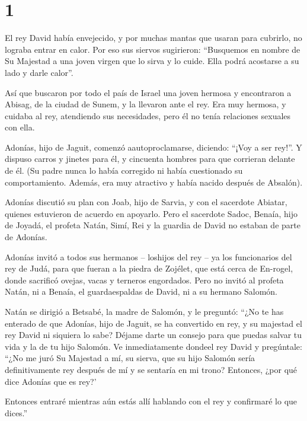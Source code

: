 \hypertarget{section}{%
\section{1}\label{section}}

 El rey David había envejecido, y por muchas mantas que
usaran para cubrirlo, no lograba entrar en calor.  Por eso
sus siervos sugirieron: ``Busquemos en nombre de Su Majestad a una joven
virgen que lo sirva y lo cuide. Ella podrá acostarse a su lado y darle
calor''.

 Así que buscaron por todo el país de Israel una joven
hermosa y encontraron a Abisag, de la ciudad de Sunem, y la llevaron
ante el rey.  Era muy hermosa, y cuidaba al rey, atendiendo
sus necesidades, pero él no tenía relaciones sexuales con ella.

 Adonías, hijo de Jaguit, comenzó aautoproclamarse,
diciendo: ``¡Voy a ser rey!''. Y dispuso carros y jinetes para él, y
cincuenta hombres para que corrieran delante de él.  (Su
padre nunca lo había corregido ni había cuestionado su comportamiento.
Además, era muy atractivo y había nacido después de Absalón).

 Adonías discutió su plan con Joab, hijo de Sarvia, y con el
sacerdote Abiatar, quienes estuvieron de acuerdo en apoyarlo.
 Pero el sacerdote Sadoc, Benaía, hijo de Joyadá, el profeta
Natán, Simí, Rei y la guardia de David no estaban de parte de Adonías.

 Adonías invitó a todos sus hermanos -- loshijos del rey --
ya los funcionarios del rey de Judá, para que fueran a la piedra de
Zojélet, que está cerca de En-rogel, donde sacrificó ovejas, vacas y
terneros engordados.  Pero no invitó al profeta Natán, ni a
Benaía, el guardaespaldas de David, ni a su hermano Salomón.

 Natán se dirigió a Betsabé, la madre de Salomón, y le
preguntó: ``¿No te has enterado de que Adonías, hijo de Jaguit, se ha
convertido en rey, y su majestad el rey David ni siquiera lo sabe?
 Déjame darte un consejo para que puedas salvar tu vida y
la de tu hijo Salomón.  Ve inmediatamente dondeel rey David
y pregúntale: ``¿No me juró Su Majestad a mí, su sierva, que su hijo
Salomón sería definitivamente rey después de mí y se sentaría en mi
trono? Entonces, ¿por qué dice Adonías que es rey?'

 Entonces entraré mientras aún estás allí hablando con el
rey y confirmaré lo que dices.''

